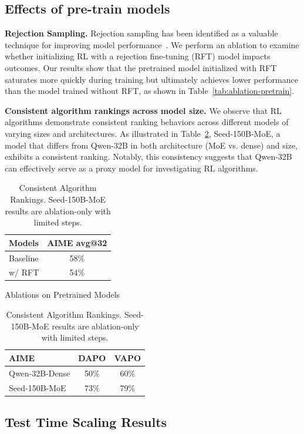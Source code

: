 

\subsection{Effects of pre-train models}

\textbf{Rejection Sampling.} Rejection sampling has been identified as a valuable technique for improving model performance~\cite{r1}. We perform an ablation to examine whether initializing RL with a rejection fine-tuning (RFT) model impacts outcomes. Our results show that the pretrained model initialized with RFT saturates more quickly during training but ultimately achieves lower performance than the model trained without RFT, as shown in Table~\ref{tab:ablation-pretrain}.

\textbf{Consistent algorithm rankings across model size.} We observe that RL algorithms demonstrate consistent ranking behaviors across different models of varying sizes and architectures. As illustrated in Table~\ref{tab:ranking}, Seed-150B-MoE, a model that differs from Qwen-32B in both architecture (MoE vs. dense) and size, exhibits a consistent ranking. Notably, this consistency suggests that Qwen-32B can effectively serve as a proxy model for investigating RL algorithms.


\begin{table}[htbp]
  \centering
  \begin{minipage}[t]{0.45\linewidth}
    \centering
    \begin{tabular}{l|c}
      \toprule
      \textbf{Models} & AIME avg@32 \\
      \midrule
      Baseline   & 58\% \\
      w/ RFT     & 54\% \\
      \bottomrule
    \end{tabular}
    \caption{Ablations on Pretrained Models}
    \label{tab:ablation-pretrain}
  \end{minipage}
  \hfill
  \begin{minipage}[t]{0.45\linewidth}
    \centering
    \begin{tabular}{l|cc}
      \toprule
      \textbf{AIME} & DAPO & VAPO \\
      \midrule
      Qwen-32B-Dense & 50\% & 60\% \\
      Seed-150B-MoE & 73\% & 79\% \\
      \bottomrule
    \end{tabular}
    \caption{Consistent Algorithm Rankings. Seed-150B-MoE results are ablation-only with limited steps.}
    \label{tab:ranking}
  \end{minipage}
\end{table}


\subsection{Test Time Scaling Results}